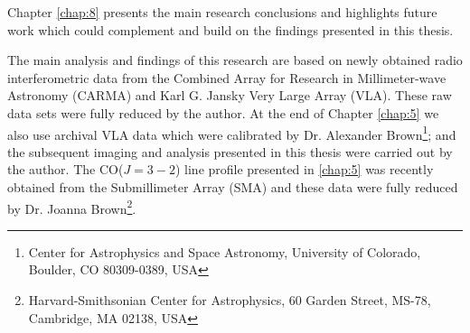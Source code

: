 Chapter \ref{chap:8} presents the main research conclusions and highlights future work which could complement and build on the findings presented in this thesis.

The main analysis and findings of this research are based on newly obtained radio interferometric data from the Combined Array for Research in Millimeter-wave Astronomy (CARMA) and Karl G. Jansky Very Large Array (VLA). These raw data sets were fully reduced by the author. At the end of Chapter \ref{chap:5} we also use archival VLA data which were calibrated by Dr. Alexander Brown\footnote{Center for Astrophysics and Space Astronomy, University of Colorado, Boulder, CO 80309-0389, USA}; and the subsequent imaging and analysis presented in this thesis were carried out by the author. The CO($J=3-2$) line profile presented in \ref{chap:5} was recently obtained from the Submillimeter Array (SMA) and these data were fully reduced by Dr. Joanna Brown\footnote{Harvard-Smithsonian Center for Astrophysics, 60 Garden Street, MS-78, Cambridge, MA 02138, USA}.
